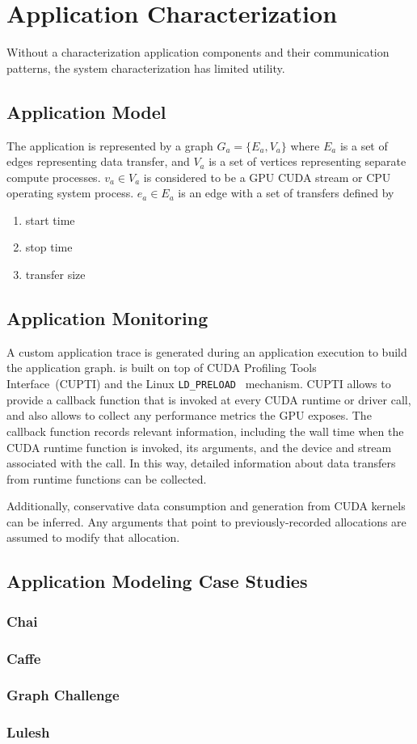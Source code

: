 \chapter{Application Characterization}

Without a characterization application components and their communication patterns, the system characterization has limited utility.


\section{Application Model}

The application is represented by a graph $G_a = \{E_a,V_a\}$ where $E_a$ is a set of edges representing data transfer, and $V_a$ is a set of vertices representing separate compute processes.
$v_a \in V_a$ is considered to be a GPU CUDA stream or CPU operating system process.
$e_a \in E_a$ is an edge with a set of transfers defined by
\begin{enumerate}
    \item start time
    \item stop time
    \item transfer size
\end{enumerate}

\section{Application Monitoring}

A custom application trace is generated during an application execution to build the application graph.
 is built on top of CUDA Profiling Tools Interface~\cite{nvidia2017cupti}(CUPTI) and the Linux \texttt{LD\_PRELOAD}~\cite{kerrisk2017ld} mechanism.
CUPTI allows  to provide a callback function that is invoked at every CUDA runtime or driver call, and also allows  to collect any performance metrics the GPU exposes.
The callback function records relevant information, including the wall time when the CUDA runtime function is invoked, its arguments, and the device and stream associated with the call.
In this way, detailed information about data transfers from runtime functions can be collected.

Additionally, conservative data consumption and generation from CUDA kernels can be inferred.
Any arguments that point to previously-recorded allocations are assumed to modify that allocation.

\section{Application Modeling Case Studies}
\subsection{Chai}
\subsection{Caffe}
\subsection{Graph Challenge}
\subsection{Lulesh}